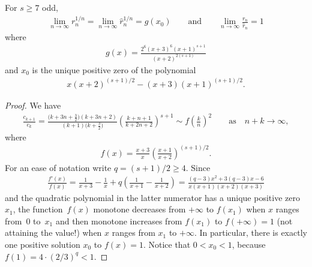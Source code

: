 \begin{lemma}\label{l4} For $s\ge7$ odd,
\begin{gather*}
\lim_{n\to\infty}r_n^{1/n}=\lim_{n\to\infty}\hat r_n^{1/n}=g(x_0)
\qquad\text{and}\qquad \lim_{n\to\infty}\frac{r_n}{\hat r_n}=1
\end{gather*}
where
\begin{gather*}
g(x)=\frac{2^6(x+3)^6(x+1)^{s+1}}{(x+2)^{2(s+1)}}
\end{gather*}
and $x_0$ is the unique positive zero of the polynomial
\begin{gather*}
x(x+2)^{(s+1)/2}-(x+3)(x+1)^{(s+1)/2}.
\end{gather*}
\end{lemma}

\begin{proof}We have
\begin{gather}
\frac{c_{k+1}}{c_k} =\frac{\big(k+3n+\frac32\big)(k+3n+2)}{(k+1)\big(k+\frac32\big)} \left(\frac{k+n+1}{k+2n+2}\right)^{s+1} \sim f\left(\frac kn\right)^2 \qquad\text{as}\quad n+k\to\infty, \label{e11}
\end{gather}
where
\begin{gather*}
f(x)=\frac{x+3}{x}\left(\frac{x+1}{x+2}\right)^{(s+1)/2}.
\end{gather*}
For an ease of notation write $q=(s+1)/2\ge4$. Since
\begin{gather*}
\frac{f'(x)}{f(x)}=\frac1{x+3}-\frac1x+q\left(\frac1{x+1}-\frac1{x+2}\right) =\frac{(q-3)x^2+3(q-3)x-6}{x(x+1)(x+2)(x+3)}
\end{gather*}
and the quadratic polynomial in the latter numerator has a unique positive zero $x_1$, the func\-tion~$f(x)$ monotone decreases from $+\infty$ to $f(x_1)$ when $x$ ranges from~$0$ to~$x_1$ and then monotone increases from $f(x_1)$ to $f(+\infty)=1$ (not attaining the value!) when $x$ ranges from $x_1$ to $+\infty$. In particular, there is exactly one positive solution $x_0$ to $f(x)=1$. Notice that $0<x_0<1$, because $f(1)=4\cdot(2/3)^q<1$.


\end{proof}
